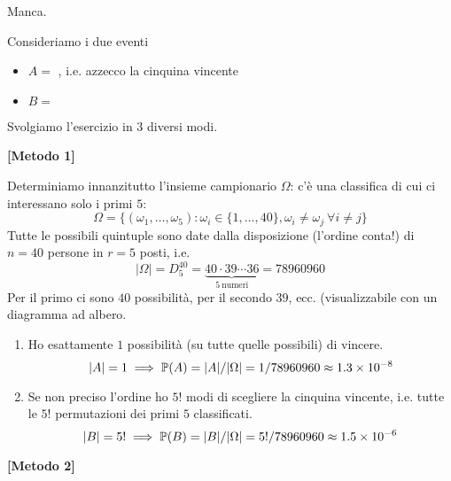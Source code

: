\begin{enumerate}
\end{enumerate}

\Soluzione

Manca.

\Soluzione

Consideriamo i due eventi
\begin{itemize}
	\item $A=$ , i.e. azzecco la cinquina vincente
	\item $B=$ 
\end{itemize}

Svolgiamo l'esercizio in $3$ diversi modi.

\textbf{[Metodo 1]}

Determiniamo innanzitutto l'insieme campionario $\Omega $: c'è una classifica di cui ci interessano solo i primi $5$:
\begin{equation*}
	\Omega =\{(\omega_{1} ,\dots ,\omega_{5}) :\omega_{i} \in \{1,\dots,40\} ,\omega_{i} \neq \omega_{j} \ \forall i\neq j\}
\end{equation*}
Tutte le possibili quintuple sono date dalla disposizione (l'ordine conta!) di $n=40$ persone in $r=5$ posti, i.e.
\begin{equation*}
	| \Omega | =D_{5}^{40} =\underbrace{40\cdot 39\cdots 36}_{5\ \text{numeri}} =78960960
\end{equation*}
Per il primo ci sono $40$ possibilità, per il secondo $39$, ecc. (visualizzabile con un diagramma ad albero.
\begin{enumerate}
	\item Ho esattamente $1$ possibilità (su tutte quelle possibili) di vincere.
	\begin{equation*}
		| A| =1\implies \mathbb{P}(A) =| A| /| \Omega | =1/78960960\approx 1.3\times 10^{-8}
	\end{equation*}
	\item Se non preciso l'ordine ho $5!$ modi di scegliere la cinquina vincente, i.e. tutte le $5!$ permutazioni dei primi $5$ classificati.
	\begin{equation*}
		| B| =5!\implies \mathbb{P}(B) =| B| /| \Omega | =5!/78960960\approx 1.5\times 10^{-6}
	\end{equation*}
\end{enumerate}

\textbf{[Metodo 2]}

